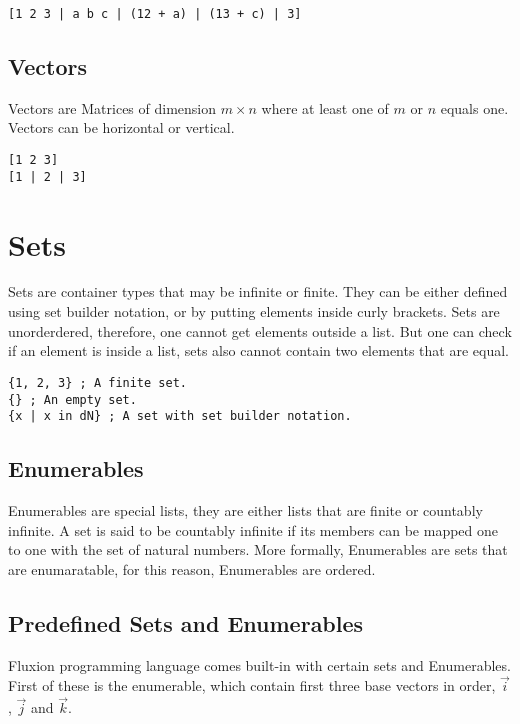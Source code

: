 \documentclass[11pt,a4paper]{book}
\begin{document}
\begin{lstlisting}[caption={An example matrix},captionpos=b]
[1 2 3 | a b c | (12 + a) | (13 + c) | 3]
\end{lstlisting}

\subsection{Vectors}

Vectors are Matrices of dimension $m \times n$ where at least one of $m$ or $n$ equals one. Vectors can be horizontal or vertical.

\begin{lstlisting}[caption={Example vectors},captionpos=b]
[1 2 3]
[1 | 2 | 3]
\end{lstlisting}

\section{Sets}

Sets are container types that may be infinite or finite. They can be either defined using set builder notation, or by putting elements inside curly brackets. Sets are unorderdered, therefore, one cannot get elements outside a list. But one can check if an element is inside a list, sets also cannot contain two elements that are equal.

\begin{lstlisting}[caption={Example vectors},captionpos=b]
{1, 2, 3} ; A finite set.
{} ; An empty set.
{x | x in dN} ; A set with set builder notation.
\end{lstlisting}

\subsection{Enumerables}

Enumerables are special lists, they are either lists that are finite or countably infinite. A set is said to be countably infinite if its members can be mapped one to one with the set of natural numbers. More formally, Enumerables are sets that are enumaratable, for this reason, Enumerables are ordered.

\subsection{Predefined Sets and Enumerables}

Fluxion programming language comes built-in with certain sets and Enumerables. First of these is the  enumerable, which contain first three base vectors in order, $\vec{i}$, $\vec{j}$ and $\vec{k}$.
\end{document}
